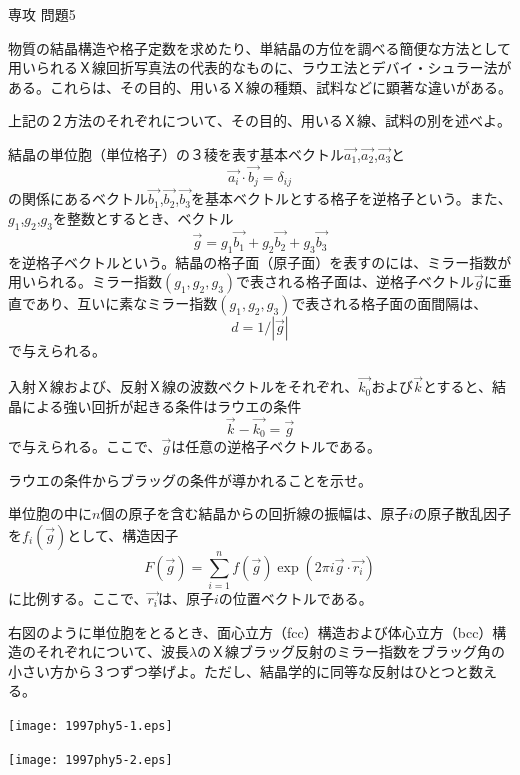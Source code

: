 \documentclass[fleqn]{jbook}
\begin{document}
\begin{question}{専攻 問題5}{}

物質の結晶構造や格子定数を求めたり、単結晶の方位を調べる簡便な方法として用いられるＸ線回折写真法の代表的なものに、ラウエ法とデバイ・シュラー法がある。これらは、その目的、用いるＸ線の種類、試料などに顕著な違いがある。

\begin{subquestions}
\SubQuestion
上記の２方法のそれぞれについて、その目的、用いるＸ線、試料の別を述べよ。
\end{subquestions}

結晶の単位胞（単位格子）の３稜を表す基本ベクトル$\Vec{a_1}$,$\Vec{a_2}$,$\Vec{a_3}$と
\[ \Vec{a_i}\cdot \Vec{b_j}=\delta_{ij}\]
の関係にあるベクトル$\Vec{b_1}$,$\Vec{b_2}$,$\Vec{b_3}$を基本ベクトルとする格子を逆格子という。また、$g_1$,$g_2$,$g_3$を整数とするとき、ベクトル
\[ \Vec{g}=g_1\Vec{b_1}+g_2\Vec{b_2}+g_3\Vec{b_3} \]
を逆格子ベクトルという。結晶の格子面（原子面）を表すのには、ミラー指数が用いられる。ミラー指数$(g_1,g_2,g_3)$で表される格子面は、逆格子ベクトル$\Vec{g}$に垂直であり、互いに素なミラー指数$(g_1,g_2,g_3)$で表される格子面の面間隔は、
\[ d=1/|\Vec{g}| \]
で与えられる。

入射Ｘ線および、反射Ｘ線の波数ベクトルをそれぞれ、$\Vec{k_0}$および$\Vec{k}$とすると、結晶による強い回折が起きる条件はラウエの条件
\[ \Vec{k}-\Vec{k_0}=\Vec{g} \]
で与えられる。ここで、$\Vec{g}$は任意の逆格子ベクトルである。

\begin{subquestions}[2]
\SubQuestion
ラウエの条件からブラッグの条件が導かれることを示せ。
\end{subquestions}

単位胞の中に$n$個の原子を含む結晶からの回折線の振幅は、原子$i$の原子散乱因子を$f_i(\Vec{g})$として、構造因子
\[ F(\Vec{g})=\sum_{i=1}^n f(\Vec{g})\exp(2\pi i \Vec{g}\cdot \Vec{r_i}) \]
に比例する。ここで、$\Vec{r_i}$は、原子$i$の位置ベクトルである。

\begin{subquestions}[3]
\SubQuestion
\parbox[t]{70mm}{
右図のように単位胞をとるとき、面心立方（fcc）構造および体心立方（bcc）構造のそれぞれについて、波長$\lambda$のＸ線ブラッグ反射のミラー指数をブラッグ角の小さい方から３つずつ挙げよ。ただし、結晶学的に同等な反射はひとつと数える。}\parbox[t]{50mm}{\vspace*{-5mm}
\begin{center}
\texttt{[image: 1997phy5-1.eps]}
\end{center}
}\parbox[t]{50mm}{\vspace*{-5mm}
\begin{center}
\texttt{[image: 1997phy5-2.eps]}
\end{center}
}
\end{subquestions}


\end{question}
\end{document}
